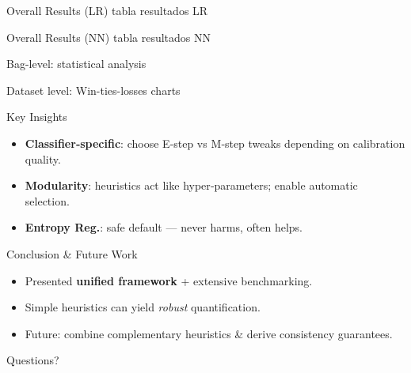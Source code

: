 \documentclass[aspectratio=169]{beamer}
\begin{document}
\begin{frame}{Overall Results (LR)}
  \centering
  tabla resultados LR
\end{frame}

\begin{frame}{Overall Results (NN)}
  \centering
  tabla resultados NN
\end{frame}

\begin{frame}{Bag-level: statistical analysis}
  \centering
  
\end{frame}

\begin{frame}{Dataset level: Win-ties-losses charts}
  \centering
  
\end{frame}

\begin{frame}{Key Insights}
  \begin{itemize}
    \item \textbf{Classifier‑specific}: choose E‑step vs M‑step tweaks depending on calibration quality.
    \item \textbf{Modularity}: heuristics act like hyper‑parameters; enable automatic selection.
    \item \textbf{Entropy Reg.}: safe default — never harms, often helps.
  \end{itemize}
\end{frame}

\begin{frame}{Conclusion & Future Work}
  \begin{itemize}
    \item Presented \textbf{unified framework} + extensive benchmarking.
    \item Simple heuristics can yield \textit{robust} quantification.
    \item Future: combine complementary heuristics & derive consistency guarantees.
  \end{itemize}
\end{frame}

\begin{frame}[standout]
Questions?
\end{frame}
\end{document}
